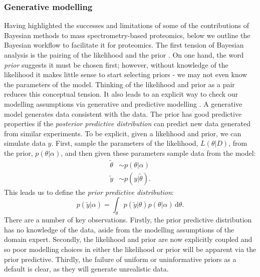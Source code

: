 \documentclass[12pt,english, journal=jpr, layout=twocolumn]{article}
\begin{document}
\subsubsection{Generative modelling}
Having highlighted the successes and limitations of some of the contributions of Bayesian methods to mass spectrometry-based proteomics, below we outline the Bayesian workflow to facilitate it for proteomics. The first tension of Bayesian analysis is the pairing of the likelihood and the prior \citep{Gelman::2017, Gelman::2020, Betancourt::2021}. On one hand, the word \textit{prior} suggests it must be chosen first; however, without knowledge of the likelihood it makes little sense to start selecting priors - we  may not even know the parameters of the model. Thinking of the likelihood and prior as a pair reduces this conceptual tension. It also leads to an explicit way to check our modelling assumptions via generative and predictive modelling \citep{Betancourt::2021}. A generative model generates data consistent with the data. The prior has good predictive properties if the \textit{posterior predictive distribution} can predict new data generated from similar experiments. To be explicit, given a likelihood and prior, we can simulate data $y$. First, sample the parameters of the likelihood, $ L(\theta|D)$, from the prior, $p(\theta|\alpha)$, and then given these parameters sample data from the model:	
\begin{equation}
\begin{split}
\tilde{\theta} &\sim p(\theta|\alpha) \\
\tilde{y} & \sim p(y|\tilde{\theta}).
\end{split}
\end{equation}
This leads us to define the \textit{prior predictive distribution}:
\begin{equation}
p(\tilde{y}|\alpha) = \int_{\theta} p(\tilde{y}|\theta)p(\theta|\alpha)\, \text{d}\theta.
\end{equation}
There are a number of key observations. Firstly, the prior predictive distribution has no knowledge of the data, aside from the modelling assumptions of the domain expert. Secondly, the likelihood and prior are now explicitly coupled and so poor modelling choices in either the likelihood or prior will be apparent via the prior predictive. Thirdly, the failure of uniform or uninformative priors as a default is clear, as they will generate unrealistic data.
\end{document}
